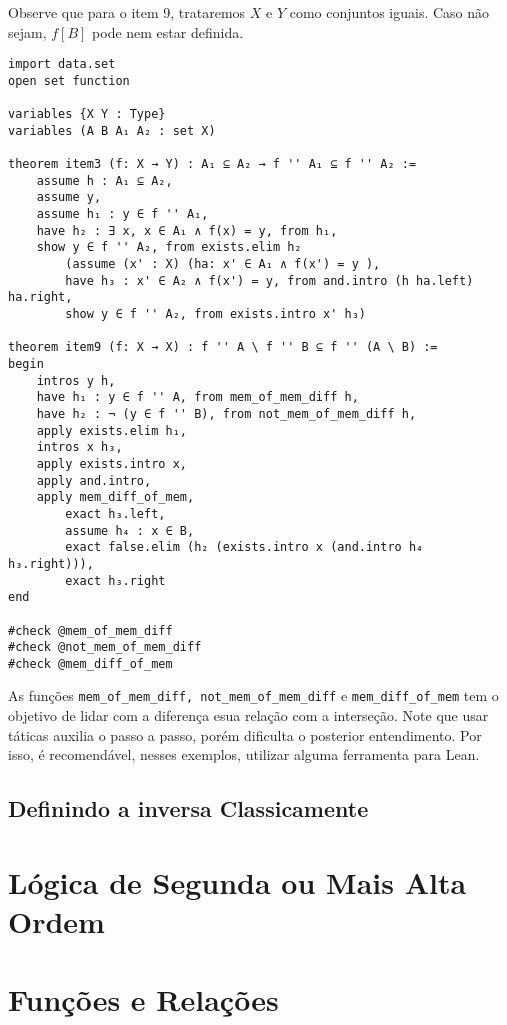 Observe que para o item 9, trataremos $X$ e $Y$ como conjuntos iguais. Caso não sejam, 
$f[B]$ pode nem estar definida. 

\begin{lstlisting}
import data.set 
open set function 

variables {X Y : Type}
variables (A B A₁ A₂ : set X)

theorem item3 (f: X → Y) : A₁ ⊆ A₂ → f '' A₁ ⊆ f '' A₂ := 
    assume h : A₁ ⊆ A₂, 
    assume y,
    assume h₁ : y ∈ f '' A₁,
    have h₂ : ∃ x, x ∈ A₁ ∧ f(x) = y, from h₁,
    show y ∈ f '' A₂, from exists.elim h₂
        (assume (x' : X) (ha: x' ∈ A₁ ∧ f(x') = y ), 
        have h₃ : x' ∈ A₂ ∧ f(x') = y, from and.intro (h ha.left)  ha.right, 
        show y ∈ f '' A₂, from exists.intro x' h₃)

theorem item9 (f: X → X) : f '' A \ f '' B ⊆ f '' (A \ B) :=
begin
    intros y h,
    have h₁ : y ∈ f '' A, from mem_of_mem_diff h,
    have h₂ : ¬ (y ∈ f '' B), from not_mem_of_mem_diff h,
    apply exists.elim h₁, 
    intros x h₃, 
    apply exists.intro x,
    apply and.intro,
    apply mem_diff_of_mem, 
        exact h₃.left,
        assume h₄ : x ∈ B, 
        exact false.elim (h₂ (exists.intro x (and.intro h₄ h₃.right))),
        exact h₃.right 
end

#check @mem_of_mem_diff
#check @not_mem_of_mem_diff
#check @mem_diff_of_mem

\end{lstlisting}

As funções \lstinline{mem_of_mem_diff, not_mem_of_mem_diff} e \lstinline{mem_diff_of_mem} 
tem o objetivo de lidar com a diferença esua relação com a interseção. Note que usar táticas
auxilia o passo a passo, porém dificulta o posterior entendimento. Por isso, é recomendável, 
nesses exemplos, utilizar alguma ferramenta para Lean.

\subsection{Definindo a inversa Classicamente}

\section{Lógica de Segunda ou Mais Alta Ordem}

\section{Funções e Relações}
